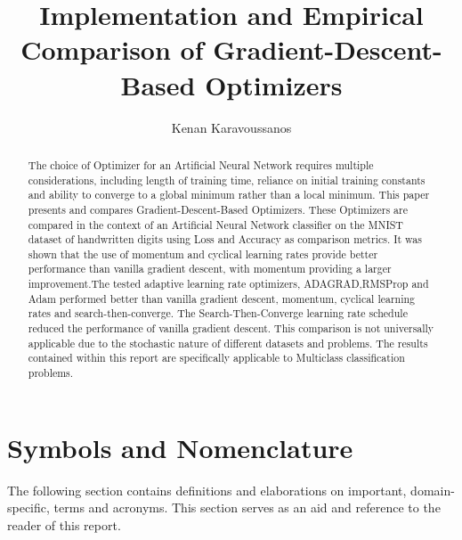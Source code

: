 \documentclass{article}
\title{Implementation and Empirical Comparison of Gradient-Descent-Based Optimizers}
\author{Kenan Karavoussanos}
\begin{document}
\maketitle
\begin{abstract}	
	
	The choice of Optimizer for an Artificial Neural Network requires multiple considerations, including length of training time, reliance on initial training constants and ability to converge to a global minimum rather than a local minimum. This paper presents and compares Gradient-Descent-Based Optimizers. These Optimizers are compared in the context of an Artificial Neural Network classifier on the MNIST dataset of handwritten digits using Loss and Accuracy as comparison metrics. It was shown that the use of momentum and cyclical learning rates provide better performance than vanilla gradient descent, with momentum providing a larger improvement.The tested adaptive learning rate optimizers, ADAGRAD,RMSProp and Adam performed better than vanilla gradient descent, momentum, cyclical learning rates and search-then-converge. The Search-Then-Converge learning rate schedule reduced the performance of vanilla gradient descent. This comparison is not universally applicable due to the stochastic nature of different datasets and problems. The results contained within this report are specifically applicable to Multiclass classification problems.
\end{abstract}	
\thispagestyle{empty}
\newpage
\clearpage
\setcounter{page}{1}
\tableofcontents
\newpage
\section*{Symbols and Nomenclature}
The following section contains definitions and elaborations on important, domain-specific, terms and acronyms. This section serves as an aid and reference to the reader of this report.
\end{document}
